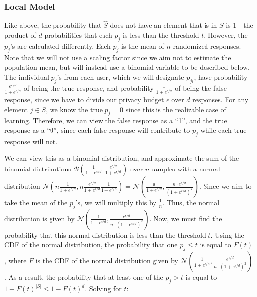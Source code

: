 \documentclass[12pt]{article}
\begin{document}
\subsubsection{Local Model}

\bigskip

\noindent

Like above, the probability that $\hat{S}$ does not have an element that is in $S$ is 1 - the product of $d$ probabilities that each $p_j$ is less than the threshold $t$. However, the $p_j$'s are calculated differently. Each $p_j$ is the mean of $n$ randomized responses. Note that we will not use a scaling factor since we aim not to estimate the population mean, but will instead use a binomial variable to be described below. The individual $p_j$'s from each user, which we will designate $p_{ji}$, have probability $\frac{e^{\epsilon/d}}{1 + e^{\epsilon/d}}$ of being the true response, and probability $\frac{1}{1 + e^{\epsilon/d}}$ of being the false response, since we have to divide our privacy budget $\epsilon$ over $d$ responses. For any element $j \in S$, we know the true $p_j = 0$ since this is the realizable case of learning. Therefore, we can view the false response as a ``1'', and the true response as a ``0'', since each false response will contribute to $p_j$ while each true response will not.

\medskip

We can view this as a binomial distribution, and approximate the sum of the binomial distributions $\mathcal{B}(\frac{1}{1 + e^{\epsilon/d}}, \frac{e^{\epsilon/d}}{1 + e^{\epsilon/d}})$ over $n$ samples with a normal distribution $\mathcal{N}(n\frac{1}{1 + e^{\epsilon/d}}, n\frac{e^{\epsilon/d}}{1 + e^{\epsilon/d}}\frac{1}{1 + e^{\epsilon/d}}) = \mathcal{N}(\frac{n}{1 + e^{\epsilon/d}}, \frac{n \cdot e^{\epsilon/d}}{(1 + e^{\epsilon/d})^2})$. Since we aim to take the mean of the $p_j$'s, we will multiply this by $\frac{1}{n}$. Thus, the normal distribution is given by $\mathcal{N}(\frac{1}{1 + e^{\epsilon/d}}, \frac{e^{\epsilon/d}}{n \cdot (1 + e^{\epsilon/d})^2})$. Now, we must find the probability that this normal distribution is less than the threshold $t$. Using the CDF of the normal distribution, the probability that one $p_j \leq t$ is equal to $F(t)$, where $F$ is the CDF of the normal distribution given by $\mathcal{N}(\frac{1}{1 + e^{\epsilon/d}}, \frac{e^{\epsilon/d}}{n \cdot (1 + e^{\epsilon/d})^2})$.  As a result, the probability that at least one of the $p_j > t$ is equal to $1 - F(t)^{|S|} \leq 1 - F(t)^d$. Solving for $t$:
\end{document}
